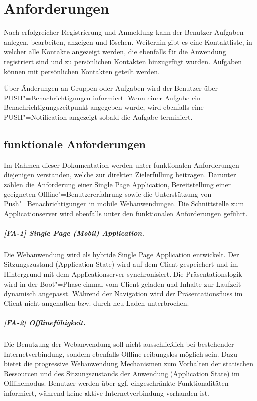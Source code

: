 \chapter{Anforderungen}
\label{chp_anforderungen}

Nach erfolgreicher Registrierung und Anmeldung kann der Benutzer Aufgaben anlegen, bearbeiten, anzeigen und löschen. Weiterhin gibt es eine Kontaktliste, in welcher alle Kontakte angezeigt werden, die ebenfalls für die Anwendung registriert sind und zu persönlichen Kontakten hinzugefügt wurden. Aufgaben können mit persönlichen Kontakten geteilt werden. 

Über Änderungen an Gruppen oder Aufgaben wird der Benutzer über PUSH"=Benachrichtigungen informiert. Wenn einer Aufgabe ein Benachrichtigungszeitpunkt angegeben wurde, wird ebenfalls eine PUSH"=Notification angezeigt sobald die Aufgabe terminiert.


\section{funktionale Anforderungen}
\label{sec_anforderungen_funktionale-anforderungen}

Im Rahmen dieser Dokumentation werden unter funktionalen Anforderungen diejenigen verstanden, welche zur direkten Zielerfüllung beitragen. Darunter zählen die Anforderung einer \glqq Single Page Application\grqq , Bereitstellung einer geeigneten Offline"=Benutzererfahrung sowie die Unterstützung von Push"=Benachrichtigungen in mobile Webanwendungen. Die Schnittstelle zum Applicationserver wird ebenfalls unter den funktionalen Anforderungen geführt.

\paragraph{[FA-1] Single Page (Mobil) Application.} Die Webanwendung wird als hybride Single Page Application entwickelt. Der Sitzungszustand (\glqq Application State\grqq) wird auf dem Client gespeichert und im Hintergrund mit dem Applicationserver synchronisiert. Die Präsentationslogik wird in der \glqq Boot"=Phase\grqq{} einmal vom Client geladen und Inhalte zur Laufzeit dynamisch angepasst. Während der Navigation wird der Präsentationsfluss im Client nicht angehalten bzw. durch \glqq neu Laden\grqq{} unterbrochen.

\paragraph{[FA-2] Offlinefähigkeit.} Die Benutzung der Webanwendung soll nicht ausschließlich bei bestehender Internetverbindung, sondern ebenfalls Offline reibungslos möglich sein. Dazu bietet die progressive Webanwendung Mechanismen zum Vorhalten der statischen Ressourcen und des Sitzungszustands der Anwendung (\glqq Application State\grqq) im Offlinemodus. Benutzer werden über ggf. eingeschränkte Funktionalitäten informiert, während keine aktive Internetverbindung vorhanden ist.

